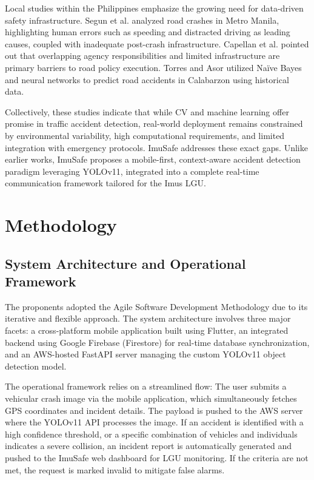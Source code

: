 \documentclass[conference]{IEEEtran}
\begin{document}
Local studies within the Philippines emphasize the growing need for data-driven safety infrastructure. Segun et al. \cite{b15} analyzed road crashes in Metro Manila, highlighting human errors such as speeding and distracted driving as leading causes, coupled with inadequate post-crash infrastructure. Capellan et al. \cite{b2} pointed out that overlapping agency responsibilities and limited infrastructure are primary barriers to road policy execution. Torres and Asor \cite{b19} utilized Naïve Bayes and neural networks to predict road accidents in Calabarzon using historical data. 

Collectively, these studies indicate that while CV and machine learning offer promise in traffic accident detection, real-world deployment remains constrained by environmental variability, high computational requirements, and limited integration with emergency protocols. ImuSafe addresses these exact gaps. Unlike earlier works, ImuSafe proposes a mobile-first, context-aware accident detection paradigm leveraging YOLOv11, integrated into a complete real-time communication framework tailored for the Imus LGU. 

\section{Methodology}

\subsection{System Architecture and Operational Framework}
The proponents adopted the Agile Software Development Methodology due to its iterative and flexible approach. The system architecture involves three major facets: a cross-platform mobile application built using Flutter, an integrated backend using Google Firebase (Firestore) for real-time database synchronization, and an AWS-hosted FastAPI server managing the custom YOLOv11 object detection model. 

The operational framework relies on a streamlined flow: The user submits a vehicular crash image via the mobile application, which simultaneously fetches GPS coordinates and incident details. The payload is pushed to the AWS server where the YOLOv11 API processes the image. If an accident is identified with a high confidence threshold, or a specific combination of vehicles and individuals indicates a severe collision, an incident report is automatically generated and pushed to the ImuSafe web dashboard for LGU monitoring. If the criteria are not met, the request is marked invalid to mitigate false alarms.
\end{document}

